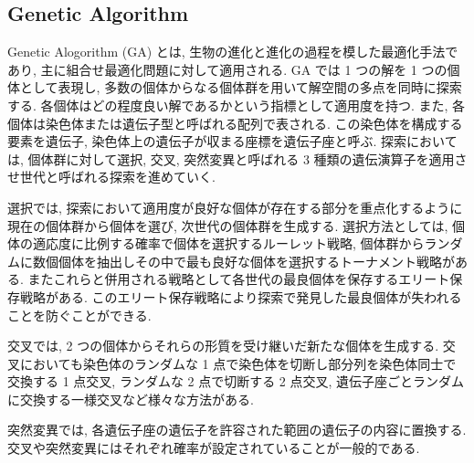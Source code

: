 \documentclass[12pt]{jarticle}
\begin{document}
\subsection{Genetic Algorithm}
Genetic Alogorithm (GA) とは, 生物の進化と進化の過程を模した最適化手法であり, 主に組合せ最適化問題に対して適用される. GA では 1 つの解を 1 つの個体として表現し, 多数の個体からなる個体群を用いて解空間の多点を同時に探索する. 各個体はどの程度良い解であるかという指標として適用度を持つ. また, 各個体は染色体または遺伝子型と呼ばれる配列で表される. この染色体を構成する要素を遺伝子, 染色体上の遺伝子が収まる座標を遺伝子座と呼ぶ. 探索においては, 個体群に対して選択, 交叉, 突然変異と呼ばれる 3 種類の遺伝演算子を適用させ世代と呼ばれる探索を進めていく.\par
選択では, 探索において適用度が良好な個体が存在する部分を重点化するように現在の個体群から個体を選び, 次世代の個体群を生成する. 選択方法としては, 個体の適応度に比例する確率で個体を選択するルーレット戦略, 個体群からランダムに数個個体を抽出しその中で最も良好な個体を選択するトーナメント戦略がある. またこれらと併用される戦略として各世代の最良個体を保存するエリート保存戦略がある. このエリート保存戦略により探索で発見した最良個体が失われることを防ぐことができる. \par
交叉では, 2 つの個体からそれらの形質を受け継いだ新たな個体を生成する. 交叉においても染色体のランダムな 1 点で染色体を切断し部分列を染色体同士で交換する 1 点交叉, ランダムな 2 点で切断する 2 点交叉, 遺伝子座ごとランダムに交換する一様交叉など様々な方法がある. \par
突然変異では, 各遺伝子座の遺伝子を許容された範囲の遺伝子の内容に置換する.
交叉や突然変異にはそれぞれ確率が設定されていることが一般的である\cite{GA説明}. 
\end{document}
